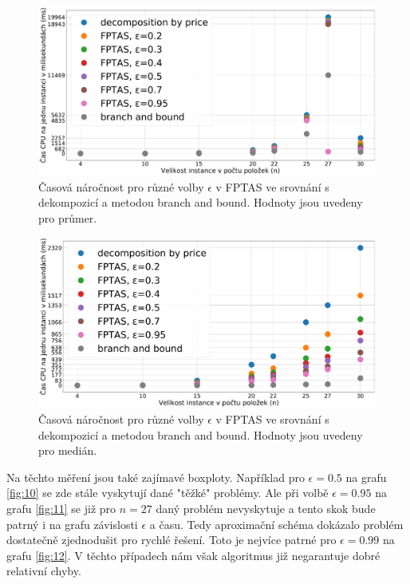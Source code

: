 \documentclass[11pt]{article}
\begin{document}
 \begin{figure}[h]\centering
	\includegraphics[scale=0.2]{img/FPTASavg}
 	\caption[2]{Časová náročnost pro různé volby $\epsilon$ v FPTAS ve srovnání s dekompozicí a metodou branch and bound. Hodnoty jsou uvedeny pro průmer.}\label{fig:8}
 \end{figure} 	
 \begin{figure}[h]\centering
	\includegraphics[scale=0.2]{img/FPTAS50}
 	\caption[2]{Časová náročnost pro různé volby $\epsilon$ v FPTAS ve srovnání s dekompozicí a metodou branch and bound. Hodnoty jsou uvedeny pro medián.}\label{fig:9}
 \end{figure} 	
 
Na těchto měření jsou také zajímavé boxploty. Například pro $\epsilon=0.5$ na grafu \ref{fig:10} se zde stále vyskytují dané "těžké" problémy. Ale při volbě $\epsilon=0.95$ na grafu \ref{fig:11} se již pro $n=27$ daný problém nevyskytuje a tento skok bude patrný i na grafu závislosti $\epsilon$ a času. Tedy aproximační schéma dokázalo problém dostatečně zjednodušit pro rychlé řešení. Toto je nejvíce patrné pro $\epsilon=0.99$ na grafu \ref{fig:12}. V těchto případech nám však algoritmus již negarantuje dobré relativní chyby.
 
\end{document}
